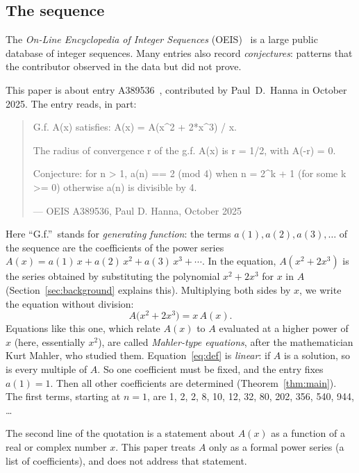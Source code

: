 \documentclass[11pt,a4paper]{article}
\theoremstyle{definition}
\theoremstyle{remark}
\begin{document}
\subsection{The sequence}\label{sec:sequence}
The \emph{On-Line Encyclopedia of Integer Sequences} (OEIS)~\cite{oeisdb} is a large public database of integer
sequences. Many
entries also record \emph{conjectures}: patterns that the contributor observed in the data but did not prove.

This paper is about entry A389536~\cite{oeis}, contributed by Paul~D.~Hanna in October 2025. The entry reads, in part:
\begin{quote}\small\ttfamily\raggedright G.f. A(x) satisfies: A(x) = A(x\^{}2 + 2*x\^{}3) / x.\par\smallskip The radius of convergence r of the g.f. A(x) is r = 1/2, with A(-r) = 0.\par\smallskip Conjecture: for n > 1, a(n) == 2 (mod 4) when n = 2\^{}k + 1 (for some k >= 0) otherwise a(n) is divisible by 4.\par\smallskip\hfill\textrm{--- OEIS A389536, Paul D. Hanna, October 2025}\end{quote}

Here ``G.f.''\ stands for \emph{generating function}: the terms $a(1),a(2),a(3),\dots$ of the sequence are the
coefficients of the power series $A(x)=a(1)\,x+a(2)\,x^2+a(3)\,x^3+\cdots$. In the equation, $A(x^2+2x^3)$ is the series
obtained by substituting the polynomial $x^2+2x^3$ for $x$ in $A$ (Section~\ref{sec:background} explains this). Multiplying both
sides by $x$, we write the equation without division:
\begin{equation}\label{eq:def}
A\bigl(x^2+2x^3\bigr)=x\,A(x).
\end{equation}
Equations like this one, which relate $A(x)$ to $A$ evaluated at a higher power of $x$ (here, essentially $x^2$), are
called \emph{Mahler-type equations}, after the mathematician Kurt Mahler, who studied them. Equation~\eqref{eq:def} is
\emph{linear}: if $A$ is a solution, so is every multiple of $A$. So one coefficient must be fixed, and the entry fixes
$a(1)=1$. Then all other coefficients are determined (Theorem~\ref{thm:main}). The first terms, starting at $n=1$, are
1, 2, 2, 8, 10, 12, 32, 80, 202, 356, 540, 944, \dots

The second line of the quotation is a statement about $A(x)$ as a function of a real or complex number $x$. This paper
treats $A$ only as a formal power series (a list of coefficients), and does not address that statement.
\end{document}
